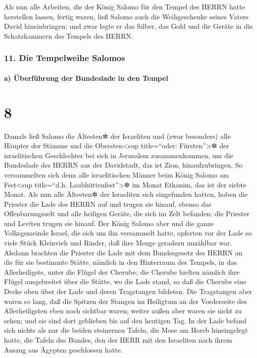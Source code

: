 Als nun alle Arbeiten, die der König Salomo für den
Tempel des HERRN hatte herstellen lassen, fertig waren, ließ Salomo auch
die Weihgeschenke seines Vaters David hineinbringen; und zwar legte er
das Silber, das Gold und die Geräte in die Schatzkammern des Tempels des
HERRN.

\hypertarget{die-tempelweihe-salomos}{%
\subsubsection{11. Die Tempelweihe
Salomos}\label{die-tempelweihe-salomos}}

\hypertarget{a-uxfcberfuxfchrung-der-bundeslade-in-den-tempel}{%
\paragraph{a) Überführung der Bundeslade in den
Tempel}\label{a-uxfcberfuxfchrung-der-bundeslade-in-den-tempel}}

\hypertarget{section-7}{%
\section{8}\label{section-7}}

Damals ließ Salomo die Ältesten✲ der Israeliten und (zwar
besonders) alle Häupter der Stämme und die Obersten\textless sup
title=``oder: Fürsten''\textgreater✲ der israelitischen Geschlechter bei
sich in Jerusalem zusammenkommen, um die Bundeslade des HERRN aus der
Davidstadt, das ist Zion, hinaufzubringen. So versammelten
sich denn alle israelitischen Männer beim König Salomo am
Fest\textless sup title=``d.h. Laubhüttenfest''\textgreater✲ im Monat
Ethanim, das ist der siebte Monat. Als nun alle Ältesten✲
der Israeliten sich eingefunden hatten, hoben die Priester die Lade des
HERRN auf und trugen sie hinauf, ebenso das
Offenbarungszelt und alle heiligen Geräte, die sich im Zelt befanden:
die Priester und Leviten trugen sie hinauf. Der König
Salomo aber und die ganze Volksgemeinde Israel, die sich um ihn
versammelt hatte, opferten vor der Lade so viele Stück Kleinvieh und
Rinder, daß ihre Menge geradezu unzählbar war. Alsdann
brachten die Priester die Lade mit dem Bundesgesetz des HERRN an die für
sie bestimmte Stätte, nämlich in den Hinterraum des Tempels, in das
Allerheiligste, unter die Flügel der Cherube; die Cherube
hielten nämlich ihre Flügel ausgebreitet über die Stätte, wo die Lade
stand, so daß die Cherube eine Decke oben über der Lade und deren
Tragstangen bildeten. Die Tragstangen aber waren so lang,
daß die Spitzen der Stangen im Heiligtum an der Vorderseite des
Allerheiligsten eben noch sichtbar waren; weiter außen aber waren sie
nicht zu sehen; und sie sind dort geblieben bis auf den heutigen Tag.
In der Lade befand sich nichts als nur die beiden
steinernen Tafeln, die Mose am Horeb hineingelegt hatte, die Tafeln des
Bundes, den der HERR mit den Israeliten nach ihrem Auszug aus Ägypten
geschlossen hatte.


